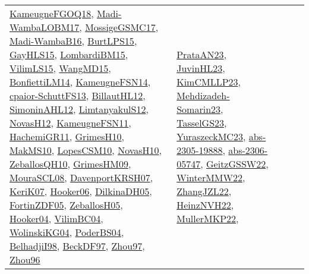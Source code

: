 {\begin{longtable}{lp{3cm}>{\raggedright}p{6cm}>{\raggedright}p{6cm}p{8cm}}
\href{papers/KameugneFGOQ18.pdf}{KameugneFGOQ18}\cite{KameugneFGOQ18}, \href{papers/Madi-WambaLOBM17.pdf}{Madi-WambaLOBM17}\cite{Madi-WambaLOBM17}, \href{papers/MossigeGSMC17.pdf}{MossigeGSMC17}\cite{MossigeGSMC17}, \href{papers/Madi-WambaB16.pdf}{Madi-WambaB16}\cite{Madi-WambaB16}, \href{papers/BurtLPS15.pdf}{BurtLPS15}\cite{BurtLPS15}, \href{papers/GayHLS15.pdf}{GayHLS15}\cite{GayHLS15}, \href{papers/LombardiBM15.pdf}{LombardiBM15}\cite{LombardiBM15}, \href{papers/VilimLS15.pdf}{VilimLS15}\cite{VilimLS15}, \href{articles/WangMD15.pdf}{WangMD15}\cite{WangMD15}, \href{papers/BonfiettiLM14.pdf}{BonfiettiLM14}\cite{BonfiettiLM14}, \href{articles/KameugneFSN14.pdf}{KameugneFSN14}\cite{KameugneFSN14}, \href{papers/cpaior-SchuttFS13.pdf}{cpaior-SchuttFS13}\cite{cpaior-SchuttFS13}, \href{papers/BillautHL12.pdf}{BillautHL12}\cite{BillautHL12}, \href{papers/SimoninAHL12.pdf}{SimoninAHL12}\cite{SimoninAHL12}, \href{articles/LimtanyakulS12.pdf}{LimtanyakulS12}\cite{LimtanyakulS12}, \href{articles/NovasH12.pdf}{NovasH12}\cite{NovasH12}, \href{papers/KameugneFSN11.pdf}{KameugneFSN11}\cite{KameugneFSN11}, \href{articles/HachemiGR11.pdf}{HachemiGR11}\cite{HachemiGR11}, \href{papers/GrimesH10.pdf}{GrimesH10}\cite{GrimesH10}, \href{papers/MakMS10.pdf}{MakMS10}\cite{MakMS10}, \href{articles/LopesCSM10.pdf}{LopesCSM10}\cite{LopesCSM10}, \href{articles/NovasH10.pdf}{NovasH10}\cite{NovasH10}, \href{articles/ZeballosQH10.pdf}{ZeballosQH10}\cite{ZeballosQH10}, \href{papers/GrimesHM09.pdf}{GrimesHM09}\cite{GrimesHM09}, \href{papers/MouraSCL08.pdf}{MouraSCL08}\cite{MouraSCL08}, \href{papers/DavenportKRSH07.pdf}{DavenportKRSH07}\cite{DavenportKRSH07}, \href{papers/KeriK07.pdf}{KeriK07}\cite{KeriK07}, \href{articles/Hooker06.pdf}{Hooker06}\cite{Hooker06}, \href{papers/DilkinaDH05.pdf}{DilkinaDH05}\cite{DilkinaDH05}, \href{papers/FortinZDF05.pdf}{FortinZDF05}\cite{FortinZDF05}, \href{articles/ZeballosH05.pdf}{ZeballosH05}\cite{ZeballosH05}, \href{papers/Hooker04.pdf}{Hooker04}\cite{Hooker04}, \href{papers/VilimBC04.pdf}{VilimBC04}\cite{VilimBC04}, \href{papers/WolinskiKG04.pdf}{WolinskiKG04}\cite{WolinskiKG04}, \href{articles/PoderBS04.pdf}{PoderBS04}\cite{PoderBS04}, \href{articles/BelhadjiI98.pdf}{BelhadjiI98}\cite{BelhadjiI98}, \href{papers/BeckDF97.pdf}{BeckDF97}\cite{BeckDF97}, \href{articles/Zhou97.pdf}{Zhou97}\cite{Zhou97}, \href{papers/Zhou96.pdf}{Zhou96}\cite{Zhou96} & \href{articles/PrataAN23.pdf}{PrataAN23}\cite{PrataAN23}, \href{papers/JuvinHL23.pdf}{JuvinHL23}\cite{JuvinHL23}, \href{papers/KimCMLLP23.pdf}{KimCMLLP23}\cite{KimCMLLP23}, \href{papers/Mehdizadeh-Somarin23.pdf}{Mehdizadeh-Somarin23}\cite{Mehdizadeh-Somarin23}, \href{papers/TasselGS23.pdf}{TasselGS23}\cite{TasselGS23}, \href{papers/YuraszeckMC23.pdf}{YuraszeckMC23}\cite{YuraszeckMC23}, \href{articles/abs-2305-19888.pdf}{abs-2305-19888}\cite{abs-2305-19888}, \href{articles/abs-2306-05747.pdf}{abs-2306-05747}\cite{abs-2306-05747}, \href{papers/GeitzGSSW22.pdf}{GeitzGSSW22}\cite{GeitzGSSW22}, \href{papers/WinterMMW22.pdf}{WinterMMW22}\cite{WinterMMW22}, \href{papers/ZhangJZL22.pdf}{ZhangJZL22}\cite{ZhangJZL22}, \href{articles/HeinzNVH22.pdf}{HeinzNVH22}\cite{HeinzNVH22}, \href{articles/MullerMKP22.pdf}{MullerMKP22}\cite{MullerMKP22}, 
\end{longtable}}
